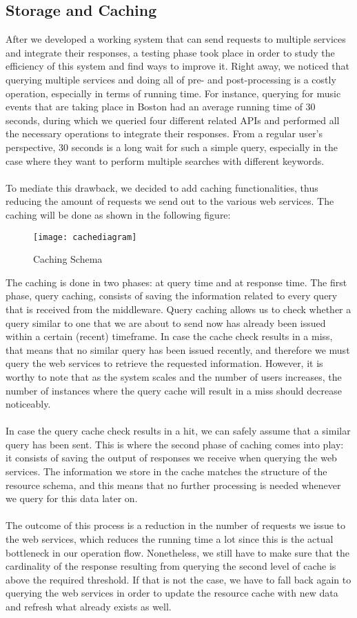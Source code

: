 \subsection{Storage and Caching}
After we developed a working system that can send requests to multiple services and integrate their responses, a testing phase took place in order to study the efficiency of this system and find ways to improve it. Right away, we noticed that querying multiple services and doing all of pre- and post-processing is a costly operation, especially in terms of running time. For instance, querying for music events that are taking place in Boston had an average running time of 30 seconds, during which we queried four different related APIs and performed all the necessary operations to integrate their responses. From a regular user's perspective, 30 seconds is a long wait for such a simple query, especially in the case where they want to perform multiple searches with different keywords.\\\\
To mediate this drawback, we decided to add caching functionalities, thus reducing the amount of requests we send out to the various web services. The caching will be done as shown in the following figure:
\begin{figure}[h]
\centering
\texttt{[image: cachediagram]}
\caption{Caching Schema}
\end{figure}
\newpage
\noindent The caching is done in two phases: at query time and at response time. The first phase, query caching, consists of saving the information related to every query that is received from the middleware. Query caching allows us to check whether a query similar to one that we are about to send now has already been issued within a certain (recent) timeframe. In case the cache check results in a miss, that means that no similar query has been issued recently, and therefore we must query the web services to retrieve the requested information. However, it is worthy to note that as the system scales and the number of users increases, the number of instances where the query cache will result in a miss should decrease noticeably.\\\\
In case the query cache check results in a hit, we can safely assume that a similar query has been sent. This is where the second phase of caching comes into play: it consists of saving the output of responses we receive when querying the web services. The information we store in the cache matches the structure of the resource schema, and this means that no further processing is needed whenever we query for this data later on.\\\\
The outcome of this process is a reduction in the number of requests we issue to the web services, which reduces the running time a lot since this is the actual bottleneck in our operation flow. Nonetheless, we still have to make sure that the cardinality of the response resulting from querying the second level of cache is above the required threshold. If that is not the case, we have to fall back again to querying the web services in order to update the resource cache with new data and refresh what already exists as well.